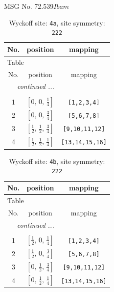 \documentclass[fleqn,8pt]{jsarticle}
\begin{document}
\setcounter{MaxMatrixCols}{32}

\renewcommand{\tablename}{Table~}
\renewcommand{\figurename}{Figure~}
\begin{center}
\LARGE
MSG No. 72.539\quad$Ibam$
\end{center}
\renewcommand{\arraystretch}{1.2}
\begin{longtable}{ccc}
\caption{Wyckoff site: {\tt 4a}, site symmetry: {\tt 222}}
 \\
 \hline \hline
No. & position & mapping \\ \hline \endfirsthead

\multicolumn{2}{l}{\tablename\ \thetable{}} \\
 \hline \hline
No. & position & mapping \\ \hline \endhead

 \hline \hline
\multicolumn{2}{r}{\footnotesize\it continued ...} \\ \endfoot

 \hline \hline
\multicolumn{2}{r}{} \\ \endlastfoot

1 & $\left[ 0,\, 0,\, \frac{1}{4} \right]$ & {\tt [1,2,3,4]} \\ \hline
2 & $\left[ 0,\, 0,\, \frac{3}{4} \right]$ & {\tt [5,6,7,8]} \\ \hline
3 & $\left[ \frac{1}{2},\, \frac{1}{2},\, \frac{3}{4} \right]$ & {\tt [9,10,11,12]} \\ \hline
4 & $\left[ \frac{1}{2},\, \frac{1}{2},\, \frac{1}{4} \right]$ & {\tt [13,14,15,16]} \\
\end{longtable}
\renewcommand{\arraystretch}{1.2}
\begin{longtable}{ccc}
\caption{Wyckoff site: {\tt 4b}, site symmetry: {\tt 222}}
 \\
 \hline \hline
No. & position & mapping \\ \hline \endfirsthead

\multicolumn{2}{l}{\tablename\ \thetable{}} \\
 \hline \hline
No. & position & mapping \\ \hline \endhead

 \hline \hline
\multicolumn{2}{r}{\footnotesize\it continued ...} \\ \endfoot

 \hline \hline
\multicolumn{2}{r}{} \\ \endlastfoot

1 & $\left[ \frac{1}{2},\, 0,\, \frac{1}{4} \right]$ & {\tt [1,2,3,4]} \\ \hline
2 & $\left[ \frac{1}{2},\, 0,\, \frac{3}{4} \right]$ & {\tt [5,6,7,8]} \\ \hline
3 & $\left[ 0,\, \frac{1}{2},\, \frac{3}{4} \right]$ & {\tt [9,10,11,12]} \\ \hline
4 & $\left[ 0,\, \frac{1}{2},\, \frac{1}{4} \right]$ & {\tt [13,14,15,16]} \\
\end{longtable}
\end{document}
